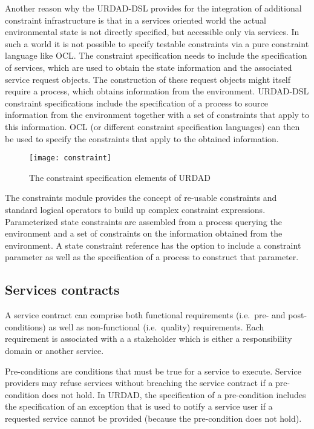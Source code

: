 Another reason why the URDAD-DSL provides for the integration of additional constraint infrastructure is that in a services oriented world the actual environmental state is not directly specified, but accessible only via services. In such a world it is not possible to specify testable constraints via a pure constraint language like OCL. The constraint specification needs to include the specification of services, which are used to obtain the state information and the associated service request objects. The construction of these request objects might itself require a process, which obtains information from the environment. URDAD-DSL constraint specifications include the specification of a process to source information from the environment together with a set of constraints that apply to this information. OCL (or different constraint specification languages) can then be used to specify the constraints that apply to the obtained information.

\begin{figure}[Htbp]
  \centering
  \texttt{[image: constraint]}
  \caption{The constraint specification elements of URDAD}
  \label{fig:metamodel}
\end{figure}

The constraints module provides the concept of re-usable constraints and standard logical operators to build up complex constraint expressions. Parameterized state constraints are assembled from a process querying the environment and a set of constraints on the information obtained from the environment. A state constraint reference has the option to include a constraint parameter as well as the specification of a process to construct that parameter.


\subsection{Services contracts}

A service contract can comprise both functional requirements (i.e.\ pre- and post-conditions) as well as non-functional (i.e.\ quality) requirements. Each requirement is associated with a a stakeholder which is either a responsibility domain or another service. 

Pre-conditions are conditions that must be true for a service to execute. Service providers may refuse  services without breaching the service contract if a pre-condition does not hold. In URDAD, the specification of a pre-condition includes the specification of an exception that is used to notify a service user if a requested service cannot be provided (because the pre-condition does not hold). 

